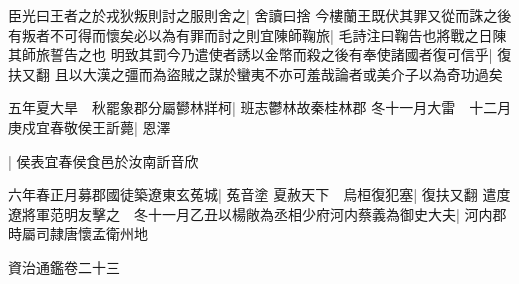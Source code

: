 臣光曰王者之於戎狄叛則討之服則舍之|{
	舍讀曰捨}
今樓蘭王既伏其罪又從而誅之後有叛者不可得而懷矣必以為有罪而討之則宜陳師鞠旅|{
	毛詩注曰鞠告也將戰之日陳其師旅誓告之也}
明致其罰今乃遣使者誘以金幣而殺之後有奉使諸國者復可信乎|{
	復扶又翻}
且以大漢之彊而為盜賊之謀於蠻夷不亦可羞哉論者或美介子以為奇功過矣

五年夏大旱　秋罷象郡分屬鬰林牂柯|{
	班志鬱林故秦桂林郡}
冬十一月大雷　十二月庚戍宜春敬侯王訢薨|{
	恩澤}


|{
	侯表宜春侯食邑於汝南訢音欣}


六年春正月募郡國徒築遼東玄菟城|{
	菟音塗}
夏赦天下　烏桓復犯塞|{
	復扶又翻}
遣度遼將軍范明友擊之　冬十一月乙丑以楊敞為丞相少府河内蔡義為御史大夫|{
	河内郡時屬司隷唐懷孟衛州地}


資治通鑑卷二十三
